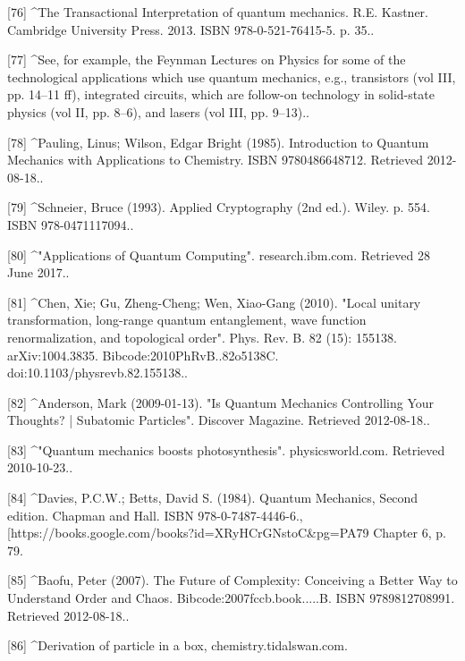 [76]
^The Transactional Interpretation of quantum mechanics. R.E. Kastner. Cambridge University Press. 2013. ISBN 978-0-521-76415-5. p. 35..

[77]
^See, for example, the Feynman Lectures on Physics for some of the technological applications which use quantum mechanics, e.g., transistors (vol III, pp. 14–11 ff), integrated circuits, which are follow-on technology in solid-state physics (vol II, pp. 8–6), and lasers (vol III, pp. 9–13)..

[78]
^Pauling, Linus; Wilson, Edgar Bright (1985). Introduction to Quantum Mechanics with Applications to Chemistry. ISBN 9780486648712. Retrieved 2012-08-18..

[79]
^Schneier, Bruce (1993). Applied Cryptography (2nd ed.). Wiley. p. 554. ISBN 978-0471117094..

[80]
^"Applications of Quantum Computing". research.ibm.com. Retrieved 28 June 2017..

[81]
^Chen, Xie; Gu, Zheng-Cheng; Wen, Xiao-Gang (2010). "Local unitary transformation, long-range quantum entanglement, wave function renormalization, and topological order". Phys. Rev. B. 82 (15): 155138. arXiv:1004.3835. Bibcode:2010PhRvB..82o5138C. doi:10.1103/physrevb.82.155138..

[82]
^Anderson, Mark (2009-01-13). "Is Quantum Mechanics Controlling Your Thoughts? | Subatomic Particles". Discover Magazine. Retrieved 2012-08-18..

[83]
^"Quantum mechanics boosts photosynthesis". physicsworld.com. Retrieved 2010-10-23..

[84]
^Davies, P.C.W.; Betts, David S. (1984). Quantum Mechanics, Second edition. Chapman and Hall. ISBN 978-0-7487-4446-6., [https://books.google.com/books?id=XRyHCrGNstoC&pg=PA79 Chapter 6, p. 79.

[85]
^Baofu, Peter (2007). The Future of Complexity: Conceiving a Better Way to Understand Order and Chaos. Bibcode:2007fccb.book.....B. ISBN 9789812708991. Retrieved 2012-08-18..

[86]
^Derivation of particle in a box, chemistry.tidalswan.com.


